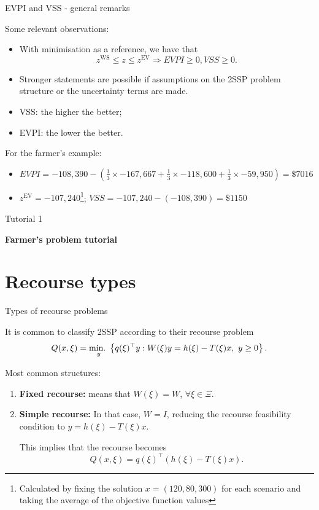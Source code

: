 	
\begin{frame}{EVPI and VSS - general remarks}

	Some relevant observations:
	\vspace{-6pt}
	\begin{itemize}
		\item With minimisation as a reference, we have that
		$$
			z^{\text{WS}} \le z \le z^{\text{EV}} \Rightarrow EVPI \ge 0, VSS \ge 0.
		$$
		\item Stronger statements are possible if assumptions on the 2SSP problem structure or the uncertainty terms are made.
		\item VSS: the \alert{higher} the better;
		\item EVPI: the \alert{lower} the better.
	\end{itemize}
	
	\pause
	For the farmer's example:
	\vspace{-6pt}
	\begin{itemize}
		\item $EVPI = -108,390- \left(\frac{1}{3}\times -167,667 + \frac{1}{3}\times -118,600 + \frac{1}{3}\times -59,950\right)  = \$7016$ 
		\item $z^{\text{EV}} = -107,240$\footnote{Calculated by fixing the solution $x=(120,80,300)$ for each scenario and taking the average of the objective function values}; $VSS = -107,240 - (-108,390) = \$1150$
	\end{itemize}
	\vspace{6pt}
\end{frame}


\begin{frame}{Tutorial 1}

\centering
\large
\bf 
Farmer's problem tutorial

	
\end{frame}


\section{Recourse types}


\begin{frame}{Types of recourse problems}

	It is common to classify 2SSP according to their \alert{recourse problem} 
	\begin{equation*}
		Q(x, \xi) = \mathop{\text{min.} \ }_y \left\{  q(\xi)^\top y : W(\xi)y = h(\xi) - T(\xi)x, \ y \ge 0 \right \}.	
	\end{equation*}
	
	Most common structures:
	\begin{enumerate}[<+->]
		\item {\bf Fixed recourse:} means that $W(\xi) = W$, $\forall \xi \in \Xi$.
		\item {\bf Simple recourse:} In that case, $W = I$, reducing the recourse feasibility condition to $y = h(\xi) - T(\xi)x$. 
		\vspace{6pt}
		
		This implies that the recourse becomes
		$$
		 Q(x,\xi) = q(\xi)^\top \left(h(\xi) - T(\xi)x\right).
		$$ 
	\end{enumerate} 
	
\end{frame}


